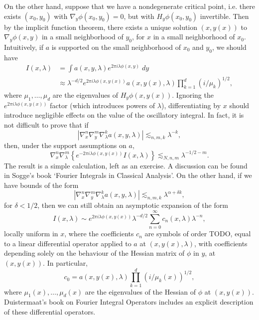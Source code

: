 On the other hand, suppose that we have a nondegenerate critical point, i.e. there exists $(x_0,y_0)$ with $\nabla_y \phi(x_0,y_0) = 0$, but with $H_y \phi(x_0,y_0)$ invertible. Then by the implicit function theorem, there exists a unique solution $(x,y(x))$ to $\nabla_y \phi(x,y)$ in a small neighborhood of $y_0$, for $x$ in a small neighborhood of $x_0$. Intuitively, if $a$ is supported on the small neighborhood of $x_0$ and $y_0$, we should have
%
\begin{align*}
    I(x,\lambda) &= \int a(x,y,\lambda) e^{2 \pi i \lambda \phi(x,y)}\; dy\\
    &\approx \lambda^{-d/2} e^{2 \pi i \lambda \phi(x,y(x))} a(x,y(x),\lambda) \prod_{k = 1}^d (i/\mu_k)^{1/2},
\end{align*}
%
where $\mu_1, \dots, \mu_d$ are the eigenvalues of $H_y \phi(x,y(x))$. Ignoring the $e^{2 \pi i \lambda \phi(x,y(x))}$ factor (which introduces powers of $\lambda$), differentiating by $x$ should introduce negligible effects on the value of the oscillatory integral. In fact, it is not difficult to prove that if
%
\[ \left| \nabla_x^n \nabla_y^m \nabla_\lambda^k a(x,y,\lambda) \right| \lesssim_{n,m,k} \lambda^{-k}, \]
%
then, under the support assumptions on $a$,
%
\[ \nabla_x^n \nabla_\lambda^m \left\{ e^{- 2 \pi i \lambda \phi(x,y(x))} I (x,\lambda) \right\}  \lesssim_{N,n,m} \lambda^{-1/2 - m}. \]
%
The result is a simple calculation, left as an exercise. A discussion can be found in Sogge's book `Fourier Integrals in Classical Analysis'. On the other hand, if we have bounds of the form
%
\[ \left| \nabla_x^n \nabla_y^m \nabla_\lambda^k a(x,y,\lambda) \right| \lesssim_{n,m,k} \lambda^{\alpha + \delta k}, \]
%
for $\delta < 1/2$, then we can still obtain an asymptotic expansion of the form
%
\[ I(x,\lambda) \sim e^{2 \pi i \lambda \phi(x,y(x))} \lambda^{-d/2} \sum_{n = 0}^\infty c_n(x,\lambda) \lambda^{-n}, \]
%
locally uniform in $x$, where the coefficients $c_n$ are symbols of order TODO, equal to a linear differential operator applied to $a$ at $(x,y(x),\lambda)$, with coefficients depending solely on the behaviour of the Hessian matrix of $\phi$ in $y$, at $(x,y(x))$. In particular,
%
\[ c_0 = a(x,y(x),\lambda) \prod_{k = 1}^d (i/\mu_k(x))^{1/2}, \]
%
where $\mu_1(x),\dots,\mu_d(x)$ are the eigenvalues of the Hessian of $\phi$ at $(x,y(x))$. Duistermaat's book on Fourier Integral Operators includes an explicit description of these differential operators.






